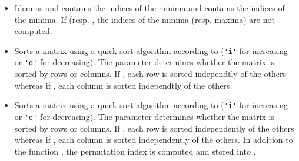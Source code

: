 \begin{itemize}
\item {}
  \sshortdescribe Idem as  and  contains the
  indices of the minima and  contains the indices of the minima. If
   (resp. , the indices of the minima
  (resp. maxima) are not computed.

\item {}
  \sshortdescribe Sorts a matrix using a quick sort algorithm according to
   (\verb!'i'! for increasing or \verb!'d'! for decreasing). The parameter  determines
  whether the matrix is sorted by rows or columns. If , each row
  is sorted independtly of the others whereas if , each column
  is sorted independtly of the others.

\item {}
  \sshortdescribe Sorts a matrix using a quick sort algorithm according to
   (\verb!'i'! for increasing or \verb!'d'! for decreasing). The
  parameter  determines whether the matrix is sorted by rows or
  columns. If , each row is sorted independently of the others
  whereas if , each column is sorted independently of the
  others. In addition to the function , the permutation
  index is computed and stored into .
\end{itemize}


